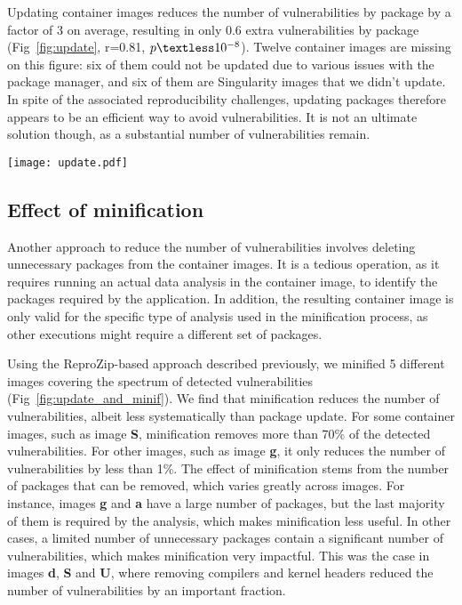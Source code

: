 Updating container images reduces the number of vulnerabilities by package
by a factor of 3 on average, resulting in only 0.6 extra vulnerabilities by
package (Fig~\ref{fig:update}, r=0.81,
$p\textless10^{-8}$). Twelve container images are missing on this figure:
six of them could not be updated due to various issues with the package
manager, and six of them are Singularity images that we didn't update.
In spite of the associated reproducibility challenges, updating
packages therefore appears to be an efficient way to avoid vulnerabilities. It
is not an ultimate solution though, as a substantial number of
vulnerabilities remain.

\begin{center}
\texttt{[image: update.pdf]}
\label{fig:update}
\end{center}

\subsection{Effect of minification}

Another approach to reduce the number of vulnerabilities involves deleting
unnecessary packages from the container images. It is a tedious operation,
as it requires running an actual data analysis in the container image, to
identify the packages required by the application. In addition, the
resulting container image is only valid for the specific type of analysis
used in the minification process, as other executions might require a
different set of packages.

Using the ReproZip-based approach described previously, we minified 5
different images covering the spectrum of detected vulnerabilities
(Fig~\ref{fig:update_and_minif}). We find that minification reduces the
number of vulnerabilities, albeit less systematically than package update.
For some container images, such as image \textbf{S}, minification removes more
than 70\% of the detected vulnerabilities. For other images, such as
image \textbf{g}, it only reduces the number of vulnerabilities by less than 1\%.
The effect of minification stems from the number of packages
that can be removed, which varies greatly across images. For
instance, images \textbf{g} and \textbf{a} have a large number of packages,
but the last majority of them is required by the analysis, which makes
minification less useful. In other cases, a limited number of unnecessary packages contain
a significant number of vulnerabilities, which makes minification very impactful.
This was the case in images \textbf{d}, \textbf{S} and \textbf{U}, where removing compilers
and kernel headers reduced the number of vulnerabilities by an important fraction.

